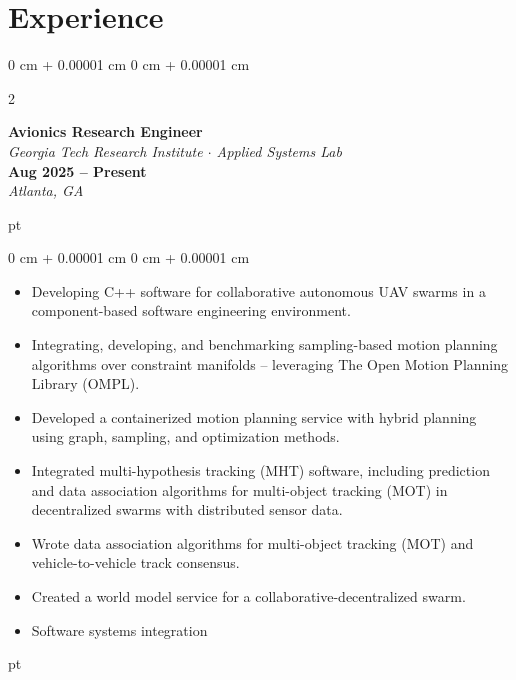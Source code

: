 \documentclass[10pt, letterpaper]{extarticle}
\newenvironment{highlights}{
    \begin{itemize}[
        topsep=0 pt,
        parsep=0 pt, 
        partopsep=0pt,
        itemsep=0pt,
        leftmargin=0.25 cm + 10pt
        ]
    }{
\end{itemize}
} %
\newenvironment{onecolentry}{
    \begin{adjustwidth}{
            0 cm + 0.00001 cm
        }{
            0 cm + 0.00001 cm
        }
    }{
    \end{adjustwidth}
} %
\newenvironment{twocolentry}[2][]{
    \onecolentry
    \def\secondColumn{#2}
    \setcolumnwidth{\fill, 4.5 cm}
    \begin{paracol}{2}
    }{
        \switchcolumn \raggedleft \secondColumn
    \end{paracol}
    \endonecolentry
} %
\begin{document}
\section{Experience}
\begin{twocolentry}{\textbf{Aug 2025 -- Present} \\\textit{Atlanta, GA}}
    \textbf{Avionics Research Engineer}\\
    \textit{Georgia Tech Research Institute $\cdot$ Applied Systems Lab}\\
\end{twocolentry}
 pt%
\begin{onecolentry}
    \begin{highlights}
        \item Developing C++ software for collaborative autonomous UAV swarms in a component-based software engineering environment. %
        \item Integrating, developing, and benchmarking sampling-based motion planning algorithms over constraint manifolds -- leveraging The Open Motion Planning Library (OMPL). %
        \item Developed a containerized motion planning service with hybrid planning using graph, sampling, and optimization methods.
        \item Integrated multi-hypothesis tracking (MHT) software, including prediction and data association algorithms for multi-object tracking (MOT) in decentralized swarms with distributed sensor data.
        \item Wrote data association algorithms for multi-object tracking (MOT) and vehicle-to-vehicle track consensus.
        \item Created a world model service for a collaborative-decentralized swarm.
        \item Software systems integration
    \end{highlights}
\end{onecolentry}
 pt%
\end{document}
